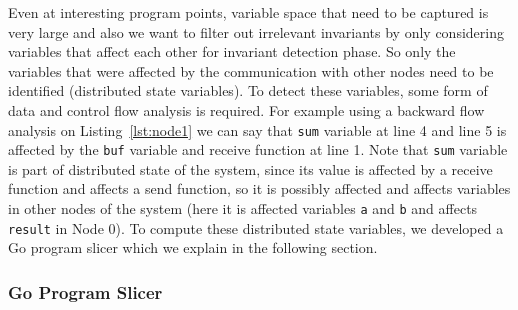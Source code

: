 Even at interesting program points, variable space that need to be
captured is very large and also we want to filter out irrelevant invariants by only considering variables that affect each other for invariant detection phase. So only the variables that were affected by
the communication with other nodes need to be identified (distributed state variables).  To detect
these variables, some form of data and control flow analysis is required. For example using a backward flow analysis on Listing~\ref{lst:node1} we can say that \texttt{sum} variable at line 4 and line 5 is affected by the \texttt{buf} variable and receive function at line 1. Note that \texttt{sum} variable is part of distributed state of the system, since its value is affected by a receive function and affects a send function, so it is possibly affected and affects variables in other nodes of the system (here it is affected variables \texttt{a} and \texttt{b} and affects \texttt{result} in Node 0). To compute these distributed state variables, we developed a Go program slicer which we explain in the following section.

\subsubsection{Go Program Slicer}

